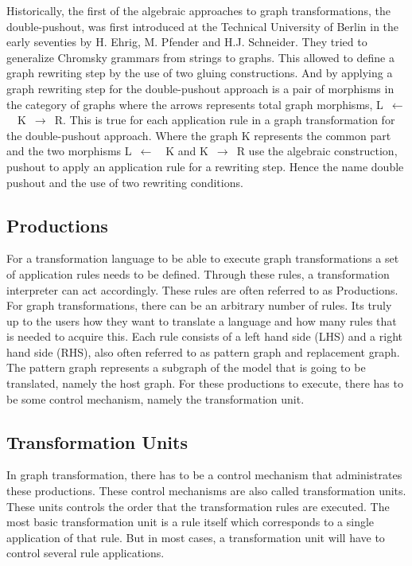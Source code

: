 \documentclass[pdftex,11pt,a4paper]{article}
\begin{document}
\indent Historically, the first of the algebraic approaches to graph
transformations, the double-pushout, was first introduced at the Technical
University of Berlin in the early seventies by H. Ehrig, M. Pfender and H.J.
Schneider\cite{INSPEC:606170}. They tried to generalize Chromsky grammars from
strings to graphs. This allowed to define a graph rewriting step by the use of
two gluing constructions. And by applying a graph rewriting step for the
double-pushout approach is a pair of morphisms in the category of graphs where
the arrows represents total graph morphisms, \linebreak\mbox{L $\longleftarrow$
\ K $\longrightarrow$ R}. This is true for each application rule in a graph
transformation for the double-pushout approach. Where the graph K represents the
common part and the two morphisms \mbox{L $\longleftarrow$ \ K} and \mbox{K
$\longrightarrow$ R} use the algebraic construction, pushout to apply an
application rule for a rewriting step. Hence the name double pushout and the use
of two rewriting conditions.

\subsection{Productions}
\noindent For a transformation language to be able to execute graph
transformations a set of application rules needs to be defined. Through these
rules, a transformation interpreter can act accordingly. These rules are often
referred to as Productions. For graph transformations, there can be an arbitrary
number of rules. Its truly up to the users how they want to translate a
language and how many rules that is needed to acquire this. Each rule consists
of a left hand side (LHS) and a right hand side (RHS), also often referred to as
pattern graph and replacement graph. The pattern graph represents a subgraph of
the model that is going to be translated, namely the host graph. For these
productions to execute, there has to be some control mechanism, namely the
transformation unit.


\subsection{Transformation Units}
\noindent In graph transformation, there has to be a control mechanism that
administrates these productions. These control mechanisms are also called
transformation units. These units controls the order that the transformation
rules are executed. The most basic transformation unit is a rule itself which
corresponds to a single application of that rule. But in most cases, a
transformation unit will have to control several rule applications. 
\end{document}
